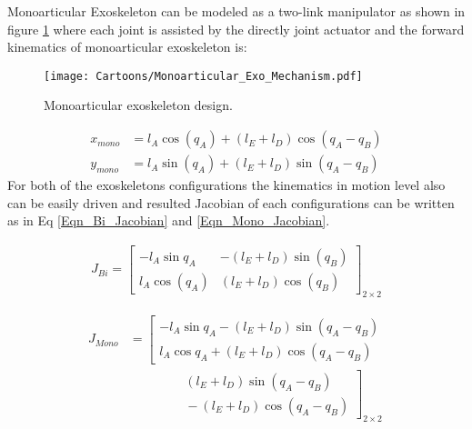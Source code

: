 \documentclass[10pt,letterpaper]{article}
\begin{document}
Monoarticular Exoskeleton can be modeled as a two-link manipulator as shown in figure \ref{Fig_Monoarticular_Exo_Mechanism} where each joint is assisted by the directly joint actuator and the forward kinematics of monoarticular exoskeleton is:
\begin{figure}[h!]
	\centering
	\texttt{[image: Cartoons/Monoarticular\_Exo\_Mechanism.pdf]}
	\caption{Monoarticular exoskeleton design.}
	\label{Fig_Monoarticular_Exo_Mechanism}
\end{figure}

\begin{align}\label{Eqn_Mono_Kin}
x_{mono} &= l_ {A}\cos (q_ {A}) + (l_ {E} + l_ {D})\cos (q_ {A} - q_ {B})\\
y_{mono} &= l_ {A}\sin (q_ {A}) + (l_ {E} + l_ {D})\sin (q_ {A} - q_ {B})
\end{align}
For both of the exoskeletons configurations the kinematics in motion level also can be easily driven and resulted Jacobian of each configurations can be written as in Eq \eqref{Eqn_Bi_Jacobian} and \eqref{Eqn_Mono_Jacobian}.

\begin{gather}\label{Eqn_Bi_Jacobian}
J_{Bi} =
\begin{bmatrix}
-l_{A}\sin{q_{A}}  & -(l_ {E} + l_ {D})\sin (q_ {B})\\
l_ {A}\cos (q_{A}) &  (l_ {E} + l_ {D})\cos (q_ {B})
\end{bmatrix}_{2 \times 2}
\end{gather}

\begin{equation}\label{Eqn_Mono_Jacobian}
\begin{aligned}
J_{Mono}&=
\left[\begin{matrix}
-l_{A}\sin{q_{A}}- (l_ {E} + l_ {D})\sin (q_ {A} - q_ {B})\\
l_{A}\cos{q_{A}} + (l_{E} + l_{D})\cos (q_{A} - q_ {B})
\end{matrix}\right.\\
&\qquad\qquad
\left.\begin{matrix}
{} (l_ {E} + l_ {D})\sin (q_ {A} - q_ {B})\\
{} - (l_ {E} + l_ {D})\cos (q_ {A} - q_ {B})
\end{matrix}\right]_{2\times 2}
\end{aligned}
\end{equation}
\end{document}
